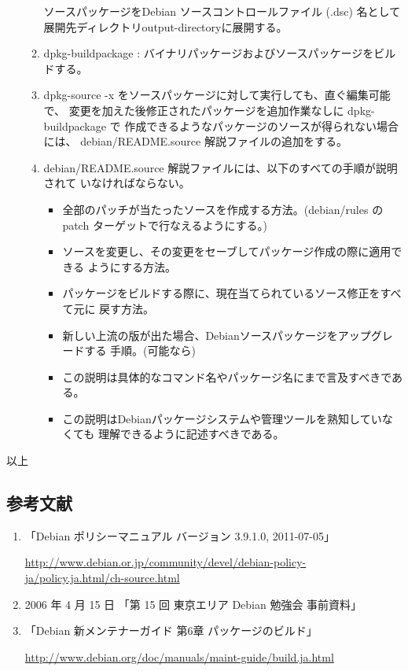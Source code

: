 \documentclass[mingoth,a4paper]{jsarticle}
\begin{document}
\begin{itemize}
\begin{enumerate}
    ソースパッケージをDebian ソースコントロールファイル (.dsc) 名として
    展開先ディレクトリoutput-directoryに展開する。
  \item dpkg-buildpackage :  バイナリパッケージおよびソースパッケージをビルドする。
  \item dpkg-source -x をソースパッケージに対して実行しても、直ぐ編集可能で、
    変更を加えた後修正されたパッケージを追加作業なしに dpkg-buildpackage で
    作成できるようなパッケージのソースが得られない場合には、
    debian/README.source 解説ファイルの追加をする。
  \item debian/README.source 解説ファイルには、以下のすべての手順が説明されて
    いなければならない。
    \begin{itemize}
    \item 全部のパッチが当たったソースを作成する方法。(debian/rules の
      patch ターゲットで行なえるようにする。)
    \item ソースを変更し、その変更をセーブしてパッケージ作成の際に適用できる
      ようにする方法。
    \item パッケージをビルドする際に、現在当てられているソース修正をすべて元に
      戻す方法。
    \item 新しい上流の版が出た場合、Debianソースパッケージをアップグレードする
      手順。(可能なら)
    \item この説明は具体的なコマンド名やパッケージ名にまで言及すべきである。
    \item この説明はDebianパッケージシステムや管理ツールを熟知していなくても
      理解できるように記述すべきである。
    \end{itemize}
  \end{enumerate}
\end{itemize}

以上

\subsection{参考文献}
\begin{enumerate}
\item 「Debian ポリシーマニュアル バージョン 3.9.1.0, 2011-07-05」

  \url{http://www.debian.or.jp/community/devel/debian-policy-ja/policy.ja.html/ch-source.html}
\item 2006 年 4 月 15 日 「第 15 回 東京エリア Debian 勉強会 事前資料」
\item 「Debian 新メンテナーガイド 第6章 パッケージのビルド」

\url{http://www.debian.org/doc/manuals/maint-guide/build.ja.html}

\end{enumerate}
\end{document}
